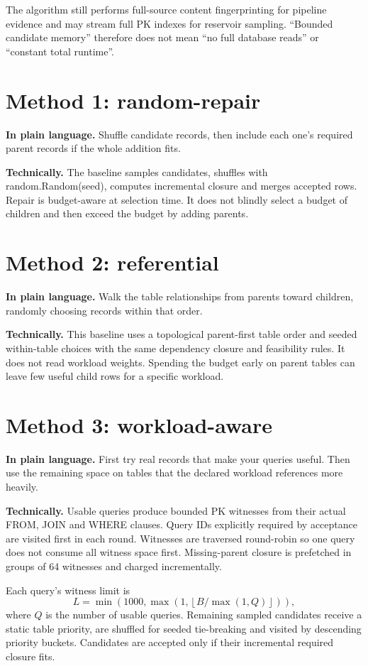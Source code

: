 \documentclass[11pt,a4paper,oneside]{report}
\newcommand{\plain}[1]{\par\textbf{In plain language.} #1\par}
\newcommand{\technical}[1]{\par\textbf{Technically.} #1\par}
\begin{document}
The algorithm still performs full-source content fingerprinting for pipeline evidence and may stream full PK indexes for reservoir sampling. ``Bounded candidate memory'' therefore does not mean ``no full database reads'' or ``constant total runtime''.

\section{Method 1: random-repair}
\plain{Shuffle candidate records, then include each one's required parent records if the whole addition fits.}
\technical{The baseline samples candidates, shuffles with random.Random(seed), computes incremental closure and merges accepted rows. Repair is budget-aware at selection time. It does not blindly select a budget of children and then exceed the budget by adding parents.}

\section{Method 2: referential}
\plain{Walk the table relationships from parents toward children, randomly choosing records within that order.}
\technical{This baseline uses a topological parent-first table order and seeded within-table choices with the same dependency closure and feasibility rules. It does not read workload weights. Spending the budget early on parent tables can leave few useful child rows for a specific workload.}

\section{Method 3: workload-aware}
\plain{First try real records that make your queries useful. Then use the remaining space on tables that the declared workload references more heavily.}
\technical{Usable queries produce bounded PK witnesses from their actual FROM, JOIN and WHERE clauses. Query IDs explicitly required by acceptance are visited first in each round. Witnesses are traversed round-robin so one query does not consume all witness space first. Missing-parent closure is prefetched in groups of 64 witnesses and charged incrementally.}

Each query's witness limit is
\[
L=\min\left(1000,\max\left(1,\left\lfloor B/\max(1,Q)\right\rfloor\right)\right),
\]
where $Q$ is the number of usable queries. Remaining sampled candidates receive a static table priority, are shuffled for seeded tie-breaking and visited by descending priority buckets. Candidates are accepted only if their incremental required closure fits.
\end{document}
